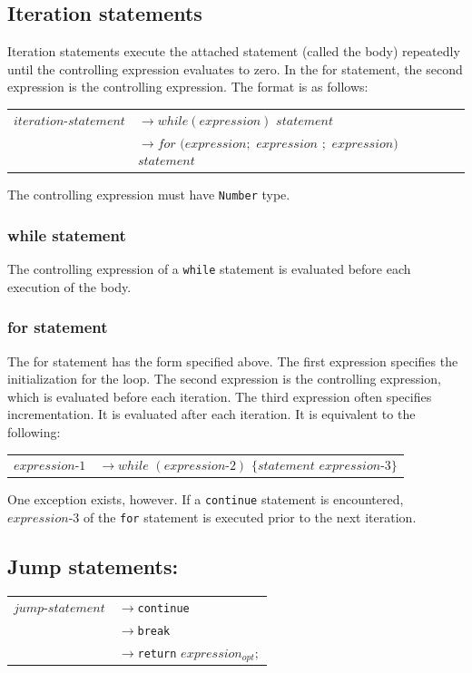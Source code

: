 \documentclass[12pt,A4]{book}
\begin{document}
\subsection{Iteration statements}
Iteration statements execute the attached statement (called the body) repeatedly until the controlling expression evaluates to zero.  In the for statement, the second expression is the controlling expression.  The format is as follows:

\begin{tabular}{l l}
$iteration\mbox{-}statement$ & $\rightarrow while(expression)$ $statement$\\
& $\rightarrow for$ $(expression;$ $expression$ $;$ $expression)$ $statement$
\end{tabular}

The controlling expression must have \verb|Number| type.
\subsubsection{while statement}
The controlling expression of a \verb|while| statement is evaluated before each execution of the body.
\subsubsection{for statement}
The for statement has the form specified above.  The first expression specifies the initialization for the loop.  The second expression is the controlling expression, which is evaluated before each iteration.  The third expression often specifies incrementation.  It is evaluated after each iteration. It is equivalent to the following:

\begin{tabular}{l l}
$expression\mbox{-}1$  & $\rightarrow while$ $(expression\mbox{-}2)$ $\{statement$ $expression\mbox{-}3\}$\\
\end{tabular}

One exception exists, however.  If a \verb|continue| statement is encountered, $expression\mbox{-}3$ of the \verb|for| statement is executed prior to the next iteration.
\subsection{Jump statements:}

\begin{tabular}{l l}
$jump\mbox{-}statement$ & $\rightarrow$\verb|continue|\\
                & $\rightarrow$\verb|break|\\
                & $\rightarrow$\verb|return| $expression_{opt};$
\end{tabular}
\end{document}
